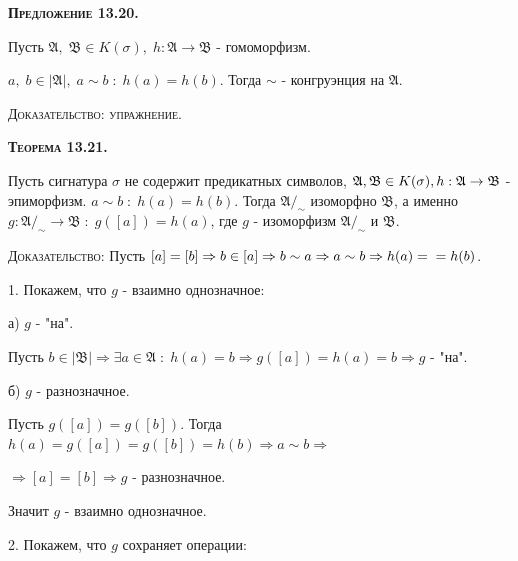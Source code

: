 \documentclass[18pt, a4paper]{extarticle}
\begin{document}
\textbf{\textsc{Предложение 13.20.}} 

Пусть $\mathfrak{A},\;\mathfrak{B}\in K(\sigma),\;h:\mathfrak{A}\to\mathfrak{B}$ -  гомоморфизм.

$a,\;b\in|\mathfrak{A}|,\;a\sim b\;:\;h(a)=h(b)$. Тогда $\sim$ -  конгруэнция на $\mathfrak{A}$.

\textsc{Доказательство: упражнение}.

\begin{center}
\end{center}

\textbf{\textsc{Теорема 13.21.}} 

Пусть сигнатура $\sigma$ не содержит предикатных символов, $\mathfrak{A},\mathfrak{B}\in K(\sigma),\\h:\mathfrak{A}\to\mathfrak{B}$ -  эпиморфизм. $a\sim b\;:\;h(a)=h(b)$. Тогда $\mathfrak{A}/_\sim$ изоморфно $\mathfrak{B}$, а именно $g:\mathfrak{A}/_\sim\to\mathfrak{B}\;:\;g([a])=h(a)$, где $g$ -  изоморфизм $\mathfrak{A}/_\sim$ и $\mathfrak{B}$. 

\textsc{Доказательство:} Пусть $[a]=[b]\Rightarrow b\in[a]\Rightarrow b\sim a\Rightarrow a\sim b\Rightarrow h(a)=\newline=h(b)$.

1. Покажем, что $g$ -  взаимно однозначное:

\qquad а) $g$ -  "на".

\qquad Пусть $b\in|\mathfrak{B}|\Rightarrow\exists a\in\mathfrak{A}\;:\;h(a)=b\Rightarrow g([a])=h(a)=b\Rightarrow g$ -  "на".

\qquad б) $g$ -  разнозначное.

\qquad Пусть $g([a])=g([b])$. Тогда $h(a)=g([a])=g([b])=h(b)\Rightarrow a\sim b\Rightarrow$

\qquad$\Rightarrow[a]=[b]\Rightarrow g$ -  разнозначное.

Значит $g$ -  взаимно однозначное.

2. Покажем, что $g$ сохраняет операции:
\end{document}
